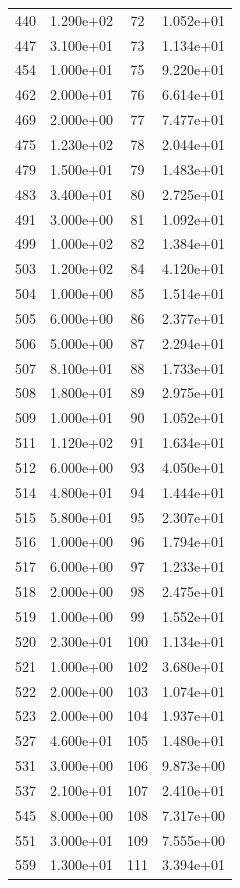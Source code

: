 \documentclass[12pt]{article}
\begin{document}
\begin{longtable}{@{}cccc@{}}
440 & 1.290e+02 & 72 & 1.052e+01 \\
447 & 3.100e+01 & 73 & 1.134e+01 \\
454 & 1.000e+01 & 75 & 9.220e+01 \\
462 & 2.000e+01 & 76 & 6.614e+01 \\
469 & 2.000e+00 & 77 & 7.477e+01 \\
475 & 1.230e+02 & 78 & 2.044e+01 \\
479 & 1.500e+01 & 79 & 1.483e+01 \\
483 & 3.400e+01 & 80 & 2.725e+01 \\
491 & 3.000e+00 & 81 & 1.092e+01 \\
499 & 1.000e+02 & 82 & 1.384e+01 \\
503 & 1.200e+02 & 84 & 4.120e+01 \\
504 & 1.000e+00 & 85 & 1.514e+01 \\
505 & 6.000e+00 & 86 & 2.377e+01 \\
506 & 5.000e+00 & 87 & 2.294e+01 \\
507 & 8.100e+01 & 88 & 1.733e+01 \\
508 & 1.800e+01 & 89 & 2.975e+01 \\
509 & 1.000e+01 & 90 & 1.052e+01 \\
511 & 1.120e+02 & 91 & 1.634e+01 \\
512 & 6.000e+00 & 93 & 4.050e+01 \\
514 & 4.800e+01 & 94 & 1.444e+01 \\
515 & 5.800e+01 & 95 & 2.307e+01 \\
516 & 1.000e+00 & 96 & 1.794e+01 \\
517 & 6.000e+00 & 97 & 1.233e+01 \\
518 & 2.000e+00 & 98 & 2.475e+01 \\
519 & 1.000e+00 & 99 & 1.552e+01 \\
520 & 2.300e+01 & 100 & 1.134e+01 \\
521 & 1.000e+00 & 102 & 3.680e+01 \\
522 & 2.000e+00 & 103 & 1.074e+01 \\
523 & 2.000e+00 & 104 & 1.937e+01 \\
527 & 4.600e+01 & 105 & 1.480e+01 \\
531 & 3.000e+00 & 106 & 9.873e+00 \\
537 & 2.100e+01 & 107 & 2.410e+01 \\
545 & 8.000e+00 & 108 & 7.317e+00 \\
551 & 3.000e+01 & 109 & 7.555e+00 \\
559 & 1.300e+01 & 111 & 3.394e+01 \\

\end{longtable}
\end{document}
